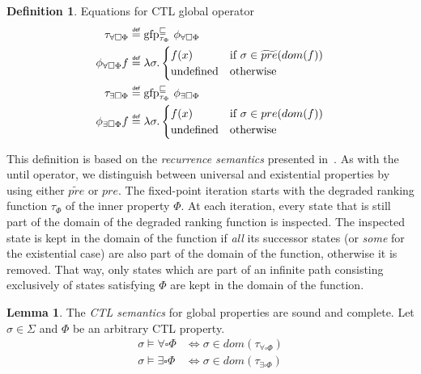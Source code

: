 \documentclass[11pt,a4paper,titlepage]{article}
\theoremstyle{definition}
\newtheorem{definition}{Definition}[section]
\newtheorem{lemma}[theorem]{Lemma}
\newcommand\eqdef{\mathrel{\overset{\makebox[0pt]{\mbox{\normalfont\tiny\sffamily def}}}{=}}}
\begin{document}
\begin{definition}\label{def:ctl_semantics_global}
    Equations for CTL global operator
    \setlength{\jot}{15pt}
    \begin{align}
        \tau_{\forall\square\Phi} &\eqdef \text{gfp}_{\tau_\Phi}^{\sqsubseteq} \  \phi_{\forall\square\Phi}\\
        \phi_{\forall\square\Phi}f &\eqdef \lambda \sigma.
        \begin{cases}
            f(x)                            & \text{if} \ \sigma \in \widetilde{pre}(dom(f)) \\
            \text{undefined}                & \text{otherwise}
        \end{cases}\\
        \tau_{\exists\square\Phi} &\eqdef \text{gfp}_{\tau_\Phi}^{\sqsubseteq} \  \phi_{\exists\square\Phi}\\
        \phi_{\exists\square\Phi}f &\eqdef \lambda \sigma.
        \begin{cases}
            f(x)                            & \text{if} \ \sigma \in pre(dom(f)) \\
            \text{undefined}                & \text{otherwise}
        \end{cases}
    \end{align}
\end{definition}

This definition is based on the \textit{recurrence semantics} presented in~\cite{UrbanM-VMCAI15}.
As with the \textsf{until} operator, we distinguish between universal and existential properties by using either $\widetilde{pre}$ or $pre$. 
The fixed-point iteration starts with the degraded ranking function $\tau_\Phi$ of the inner property $\Phi$.
At each iteration, every state that is still part of the domain of the degraded ranking function is inspected. 
The inspected state is kept in the domain of the function if \textit{all} its successor states 
(or \textit{some} for the existential case) are also part of the domain of the function, otherwise it is removed.
That way, only states which are part of an infinite path consisting exclusively of states satisfying $\Phi$ are kept in 
the domain of the function.

\begin{lemma}\label{lem:ctl_semantics_global}
    The \textit{CTL semantics} for \textsf{global} properties are sound and complete. 
    Let $\sigma \in \Sigma$ and $\Phi$ be an arbitrary CTL property.
    \begin{align}
        \sigma \models \forall\square\Phi &\iff \sigma \in dom(\tau_{\forall\square\Phi})\\
        \sigma \models \exists\square\Phi &\iff \sigma \in dom(\tau_{\exists\square\Phi})
    \end{align}
\end{lemma}
\end{document}
